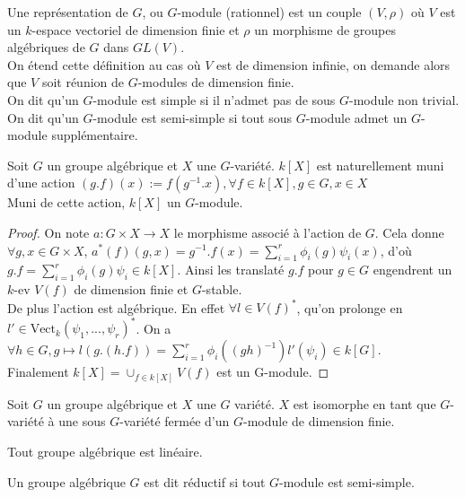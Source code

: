\begin{defn}
Une représentation de $G$, ou $G$-module (rationnel) est un couple $(V, \rho)$ où $V$ est un $k$-espace vectoriel de dimension finie et $\rho$ un morphisme de groupes algébriques de $G$ dans $GL(V)$.\\
On étend cette définition au cas où $V$ est de dimension infinie, on demande alors que $V$ soit réunion de $G$-modules de dimension finie.\\
On dit qu'un $G$-module est simple si il n'admet pas de sous $G$-module non trivial. On dit qu'un $G$-module est semi-simple si tout sous $G$-module admet un $G$-module supplémentaire.
\end{defn}

\begin{prop}
Soit $G$ un groupe algébrique et $X$ une $G$-variété. $k[X]$ est naturellement muni d'une action $(g.f)(x):=f(g^{-1}.x), \forall f\in k[X], g\in G,x\in X$\\
Muni de cette action, $k[X]$ un $G$-module.
\end{prop}
\begin{proof}
On note $a:G\times X\rightarrow X$ le morphisme associé à l'action de $G$. Cela donne $\forall g,x \in G\times X$, $a^*(f)(g,x)=g^{-1}.f(x)=\sum_{i=1}^r\phi_i(g)\psi_i(x)$, d'où $g.f=\sum_{i=1}^r\phi_i(g)\psi_i\in k[X]$. Ainsi les translaté $g.f$ pour $g\in G$ engendrent un $k$-ev $V(f)$ de dimension finie et $G$-stable. \\
De plus l'action est algébrique. En effet $\forall l\in V(f)^*$, qu'on prolonge en $l'\in \textrm{Vect}_k(\psi_1,...,\psi_r)^*$. On a $\forall h\in G, g\mapsto l(g.(h.f))=\sum_{i=1}^r\phi_i((gh)^{-1})l'(\psi_i)\in k[G]$.\\
Finalement $k[X]=\cup_{f\in k[X]}V(f)$ est un G-module.
\end{proof}

\begin{thm}\label{embed}
Soit $G$ un groupe algébrique et $X$ une $G$ variété. $X$ est isomorphe en tant que $G$-variété à une sous $G$-variété fermée d'un $G$-module de dimension finie.
\end{thm}

\begin{cor}
Tout groupe algébrique est linéaire.
\end{cor}

\begin{defn}
Un groupe algébrique $G$ est dit réductif si tout $G$-module est semi-simple.
\end{defn}

